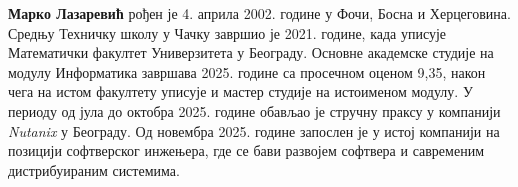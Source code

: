 \documentclass[12pt,oneside]{memoir}
\theoremstyle{definition}
\begin{document}
\begin{biografija}
\textbf{Марко Лазаревић} рођен је 4. априла 2002. године у Фочи, Босна и Херцеговина. Средњу Техничку школу у Чачку завршио је 2021. године, када уписује Математички факултет Универзитета у Београду. Основне академске студије на модулу Информатика завршава 2025. године са просечном оценом 9,35, након чега на истом факултету уписује и мастер студије на истоименом модулу. У периоду од јула до октобра 2025. године обављао је стручну праксу у компанији \textit{Nutanix} у Београду. Од новембра 2025. године запослен је у истој компанији на позицији софтверског инжењера, где се бави развојем софтвера и савременим дистрибуираним системима.
\end{biografija}
\end{document}
